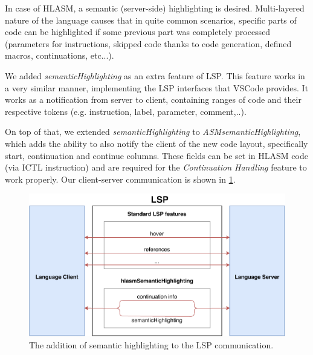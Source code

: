 In case of HLASM, a semantic (server-side) highlighting is desired. Multi-layered nature of the language causes that in quite common scenarios, specific parts of code can be highlighted if some previous part was completely processed (parameters for instructions, skipped code thanks to code generation, defined macros, continuations, etc...).

We added \emph{semanticHighlighting} as an extra feature of LSP. This feature works in a very similar manner, implementing the LSP interfaces that VSCode provides. It works as a notification from server to client, containing ranges of code and their respective tokens (e.g. instruction, label, parameter, comment,..).

On top of that, we extended \emph{semanticHighlighting} to \emph{ASMsemanticHighlighting}, which adds the ability to also notify the client of the new code layout, specifically start, continuation and continue columns. These fields can be set in HLASM code (via ICTL instruction) and are required for the \emph{Continuation Handling} feature to work properly. Our client-server communication is shown in \cref{fig08:lsp}.


\begin{figure}
	\centering
	\includegraphics[width=\textwidth]{img/lsp_addition}
	\caption{The addition of semantic highlighting to the LSP communication.}
	
	\label{fig08:lsp}
\end{figure}


